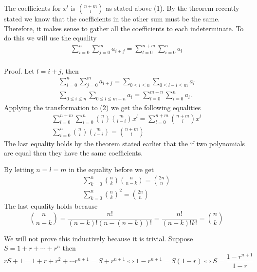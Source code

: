 \begin{problem}
{	The coefficients for $x^l$ is $\binom{n+m}{l}$ as stated above (1). By the theorem recently stated we know that the coefficients in the other sum must be the same. Therefore, it makes sense to gather all the coefficients to each indeterminate. To do this we will use the equality 
\begin{gather*}
	\sum_{i=0}^{n}\sum_{j=0}^{m}a_{i+j}=\sum_{l=0}^{n+m}\sum_{i=0}^{n}a_l \tag*{where $l=i+k$}
\end{gather*}
	\\
	Proof. Let $l=i+j$, then
	\begin{gather*}
		\sum_{i=0}^{n}\sum_{j=0}^{m}a_{i+j}=\sum_{0 \leq i \leq n}\sum_{0 \leq l-i \leq m}a_l \tag*{(Substitute $j=l-i$)} \\
		\sum_{0 \leq i \leq n}\sum_{0 \leq l \leq m+n}a_l=\sum_{l=0}^{m+n}\sum_{i=0}^{n}a_l \tag*{(Add $0\leq i \leq n$ to the left bound)}.
	\end{gather*}
	Applying the transformation to (2) we get the following equalities
	\begin{gather*}
		\sum_{l=0}^{n+m}\sum_{i=0}^{n}\binom{n}{i}\binom{m}{l-i}x^l=\sum_{l=0}^{n+m}\binom{n+m}{l}x^l \\
		\sum_{i=0}^{n}\binom{n}{i}\binom{m}{l-i}=\binom{n+m}{l}
	\end{gather*}
	The last equality holds by the theorem stated earlier that the if two polynomials are equal then they have the same coefficients.
	\item By letting $n=l=m$ in the equality before we get 
	\begin{gather*}
		\sum_{k=0}^{n}\binom{n}{k}\binom{n}{n-k}=\binom{2n}{n} \\
		\sum_{k=0}^{n}\binom{n}{k}^2=\binom{2n}{n}
	\end{gather*}
	The last equality holds because
	$$\binom{n}{n-k}=\frac{n!}{(n-k)!(n-(n-k))!}=\frac{n!}{(n-k)!k!}=\binom{n}{k}$$
	}
\end{problem}

\begin{problem} %
	We will not prove this inductively because it is trivial. Suppose $S=1+r+\cdots+r^n$ then $$rS+1=1+r+r^2+\cdots r^{n+1}=S+r^{n+1} \iff 1-r^{n+1}=S(1-r) \iff S=\frac{1-r^{n+1}}{1-r}$$
\end{problem}

